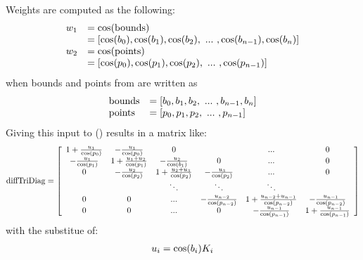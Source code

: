 \documentclass[a4paper,10pt,english]{sphinxmanual}
\begin{document}
\begin{fulllineitems}
Weights are computed as the following:
\begin{gather}
\begin{split}\begin{array}{ll}
    w_1 &= \cos(\textrm{bounds}) \\
        &= \left[ \cos(b_0), \cos(b_1), \cos(b_2), \ ... \ , \cos(b_{n-1}), \cos(b_n) \right] \\
    w_2 &= \cos(\textrm{points}) \\
        &= \left[ \cos(p_0), \cos(p_1), \cos(p_2), \ ... \ , \cos(p_{n-1}) \right]
\end{array}\end{split}\notag
\end{gather}
when bounds and points from  are written as
\begin{gather}
\begin{split}\begin{array}{ll}    
    \textrm{bounds}   &= [b_0, b_1, b_2, \ ... \ , b_{n-1}, b_{n}] \\
    \textrm{points}   &= [p_0, p_1, p_2, \ ... \ , p_{n-1}]
\end{array}\end{split}\notag
\end{gather}
Giving this input to {\hyperref[api/climlab.dynamics:climlab.dynamics.diffusion._make_diffusion_matrix]{\emph{}}} () results in a matrix like:
\begin{gather}
\begin{split}\textrm{diffTriDiag}= 
\left[ \begin{array}{cccccc}
1+\frac{u_1 }{\cos(p_0)} & -\frac{u_1}{\cos(p_0)} & 0 &  & ... & 0  \\
-\frac{u_1}{\cos(p_1)} & 1+\frac{u_1 + u_2}{\cos(p_1)} & -\frac{u_2}{\cos(b_1)} & 0 & ... & 0 \\
0 & -\frac{u_2}{\cos(p_2)}  & 1+\frac{u_2 + u_3}{\cos(p_2)} & -\frac{u_3}{\cos(p_2)} &... & 0  \\
  &  & \ddots & \ddots & \ddots & \\
0 & 0 & ... & -\frac{u_{n-2}}{\cos(p_{n-2})}  & 1+\frac{u_{n-2} + u_{n-1}}{\cos(p_{n-2})} & -\frac{u_{n-1}}{\cos(p_{n-2})} \\
0 & 0 & ... & 0 & -\frac{u_{n-1}}{\cos(p_{n-1})}  & 1+\frac{u_{n-1}}{\cos(p_{n-1})} \\
\end{array} \right] \end{split}\notag
\end{gather}
with the substitue of:
\begin{gather}
\begin{split}u_i = \cos(b_i) K_i      \end{split}\notag
\end{gather}
\end{fulllineitems}
\end{document}
